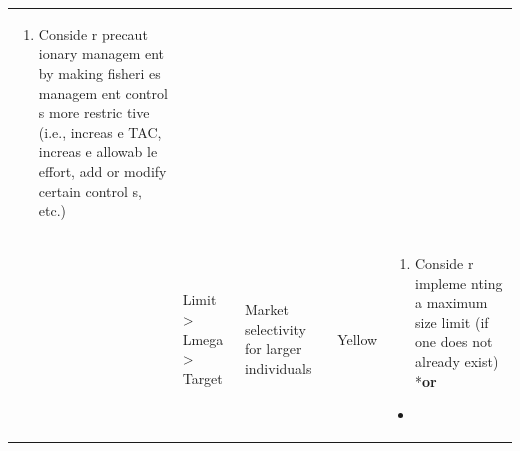 \documentclass[]{book}
\providecommand{\tightlist}{%
  \setlength{\itemsep}{0pt}\setlength{\parskip}{0pt}}
\begin{document}
\begin{longtable}[]{@{}lllll@{}}
\begin{minipage}[t]{0.19\columnwidth}
\begin{enumerate}
\tightlist
\item
  Conside r precaut ionary managem ent by making fisheri es managem ent
  control s more restric tive (i.e., increas e TAC, increas e allowab le
  effort, add or modify certain control s, etc.)
\end{enumerate}\strut
\end{minipage}\tabularnewline
\begin{minipage}[t]{0.19\columnwidth}\raggedright\strut
\strut
\end{minipage} & \begin{minipage}[t]{0.19\columnwidth}\raggedright\strut
Limit \textgreater{} Lmega \textgreater{} Target\strut
\end{minipage} & \begin{minipage}[t]{0.19\columnwidth}\raggedright\strut
Market selectivity for larger individuals\strut
\end{minipage} & \begin{minipage}[t]{0.19\columnwidth}\raggedright\strut
Yellow\strut
\end{minipage} & \begin{minipage}[t]{0.19\columnwidth}\raggedright\strut
\begin{enumerate}
\def\labelenumi{\arabic{enumi}.}
\tightlist
\item
  Conside r impleme nting a maximum size limit (if one does not already
  exist) *\textbf{or}
\end{enumerate}

\begin{itemize}
\item
\end{itemize}


\end{minipage}
\end{longtable}
\end{document}
